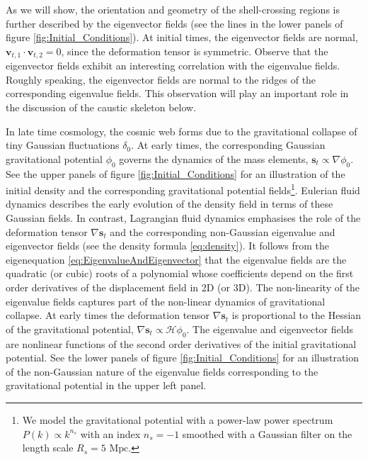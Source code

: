 \documentclass[a4paper, 11pt]{article}
\begin{document}
\begin{framed}
As we will show, the orientation and geometry of the shell-crossing
regions is further described by the eigenvector fields (see the lines in
the lower panels of figure \ref{fig:Initial_Conditions}). At initial
times, the eigenvector fields are normal, $\bm{v}_{t,1}\cdot
\bm{v}_{t,2}=0$, since the deformation tensor is symmetric. Observe that
the eigenvector fields exhibit an interesting correlation with the
eigenvalue fields. Roughly speaking, the eigenvector fields are normal
to the ridges of the corresponding eigenvalue fields. This observation
will play an important role in the discussion of the caustic skeleton
below.
\end{framed}


\begin{framed}
In late time cosmology, the cosmic web forms due to the gravitational
collapse of tiny Gaussian fluctuations $\delta_0$. At early times, the
corresponding Gaussian gravitational potential $\phi_0$ governs the
dynamics of the mass elements, $\bm{s}_t \propto \nabla \phi_0$. See the
upper panels of figure \ref{fig:Initial_Conditions} for an illustration
of the initial density and the corresponding gravitational potential
fields\footnote{We model the gravitational potential with a power-law
power spectrum $P(k) \propto k^{n_s}$ with an index $n_s=-1$ smoothed
with a Gaussian filter on the length scale $R_s=5\text{ Mpc}$.}.
Eulerian fluid dynamics describes the early evolution of the density
field in terms of these Gaussian fields. In contrast, Lagrangian fluid
dynamics emphasises the role of the deformation tensor $\nabla \bm{s}_t$
and the corresponding non-Gaussian eigenvalue and eigenvector fields
(see the density formula \eqref{eq:density}). It follows from the
eigenequation \eqref{eq:EigenvalueAndEigenvector} that the eigenvalue
fields are the quadratic (or cubic) roots of a polynomial whose
coefficients depend on the first order derivatives of the displacement
field in 2D (or 3D). The non-linearity of the eigenvalue fields captures
part of the non-linear dynamics of gravitational collapse. At early
times the deformation tensor $\nabla \bm{s}_t$ is proportional to the
Hessian of the gravitational potential, $\nabla \bm{s}_t \propto
\mathcal{H}\phi_0$. The eigenvalue and eigenvector fields are nonlinear
functions of the second order derivatives of the initial gravitational
potential. See the lower panels of figure \ref{fig:Initial_Conditions}
for an illustration of the non-Gaussian nature of the eigenvalue fields
corresponding to the gravitational potential in the upper left panel.


\end{framed}
\end{document}
